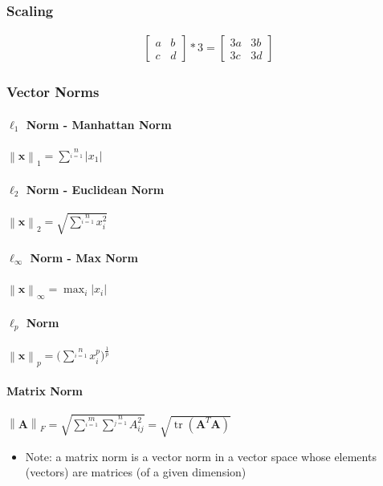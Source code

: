 \documentclass[letterpaper,12pt]{article}
\newcommand{\vect}[1]{\mathbf{#1}}
\newcommand{\matr}[1]{\mathbf{#1}}
\newcommand{\norm}[1]{\left\lVert#1\right\rVert}
\newcommand{\abs}[1]{\lvert#1\rvert}
\DeclareMathOperator{\tr}{tr}
\begin{document}
\subsubsection{Scaling}
\begin{align}
 \begin{bmatrix}
  a & b \\
  c & d
 \end{bmatrix}
 * 3
 = \begin{bmatrix}
  3a & 3b \\
  3c & 3d
 \end{bmatrix}
\end{align}

\subsubsection{Vector Norms}
\paragraph{$\ell_1$ Norm - Manhattan Norm} $\norm{\vect{x}}_1 = \sum\limits^{n}\limits_{i=1} \abs{x_1}$
\paragraph{$\ell_2$ Norm - Euclidean Norm} $\norm{\vect{x}}_2 =  \sqrt{\sum\limits^{n}\limits_{i=1} x^2_i}$
\paragraph{$\ell_\infty$ Norm - Max Norm} $\norm{\vect{x}}_\infty = \max_i \abs{x_i}$
\paragraph{$\ell_p$ Norm} $\norm{\vect{x}}_p =  \bigg(\sum\limits^{n}\limits_{i=1} x^p_i \bigg)^\frac{1}{p}$
\paragraph{Matrix Norm} $\norm{\matr{A}}_F = \sqrt{\sum\limits^{m}\limits_{i=1} \sum\limits^{n}\limits_{j=1} A^2_{ij}} = \sqrt{\tr(\matr{A}^T \matr{A})}$

\begin{itemize}
 \item Note: a matrix norm is a vector norm in a vector space whose elements (vectors) are matrices (of a given dimension)
\end{itemize}
\end{document}
